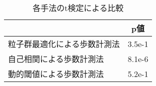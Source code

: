 \begin{table}[htb]
  \begin{center}
    \caption{各手法のt検定による比較}
    \label{resultT}
    \begin{tabular}{|l|S[table-format=1.1e+1]|} \hline
       & {p値}  \\ \hline \hline
      粒子群最適化による歩数計測法 & 3.5e-1  \\ \hline
      自己相関による歩数計測法 & 8.1e-6 \\ \hline
      動的閾値による歩数計測法 & 5.2e-1  \\ \hline
    \end{tabular}
  \end{center}
\end{table}

